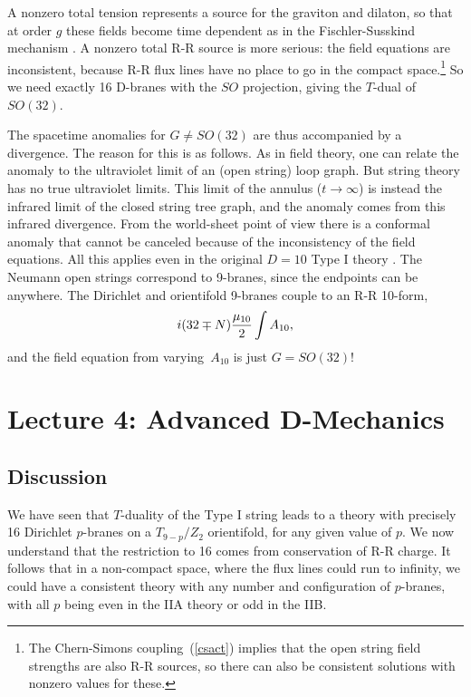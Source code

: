 \documentclass[12pt]{article}
\def\be{\begin{equation}}
\def\ee{\end{equation}}
\begin{document}
A nonzero total tension represents a source for the graviton and dilaton,
so that at order $g$ these fields become time dependent as in the
Fischler-Susskind mechanism \cite{fsuss}.
A nonzero total R-R source is more serious: the field equations are
inconsistent, because R-R flux lines have no place to go in the compact
space.\footnote
{The Chern-Simons coupling~(\ref{csact}) implies that the open
string field strengths are also R-R sources, so there can also be
consistent solutions with nonzero values for these.}
So we need exactly 16
D-branes with the $SO$ projection, giving the $T$-dual of $SO(32)$.  

The spacetime anomalies for $G \neq SO(32)$ are thus accompanied by a
divergence\cite{gsdiv}.  The reason for this is as follows.  As in field
theory, one can relate the anomaly to the ultraviolet limit of an (open
string) loop graph.  But string theory has no true ultraviolet limits.  This
limit of the annulus ($t\to \infty$) is instead the infrared limit of the
closed string tree graph, and the anomaly comes from this infrared
divergence.  From the 
world-sheet point of view there is a conformal anomaly that cannot be
canceled because of the inconsistency of the field equations.  All this
applies even in the original $D=10$ Type I theory \cite{rrex}.  The Neumann
open strings correspond to 9-branes, since the endpoints can be anywhere. 
The Dirichlet and orientifold 9-branes couple to an R-R 10-form,
\be
i (32 \mp N) {\mu_{10}\over 2} \int A_{10} ,
\ee
and the field equation from varying~$A_{10}$ is just $G =
SO(32)$!\, \cite{rrex}

\section{Lecture 4: Advanced D-Mechanics}

\subsection{Discussion}

We have seen that $T$-duality of the Type I string leads to a theory with
precisely 16 Dirichlet $p$-branes on a $T_{9-p}/Z_2$ orientifold, for any
given value of $p$.
We now understand that the restriction to 16 comes
from conservation of R-R charge.  It follows that in a non-compact space,
where the flux lines could run to infinity, we could have a consistent
theory with any number and configuration of $p$-branes, with all $p$
being even in the IIA theory or odd in the IIB.  
\end{document}
